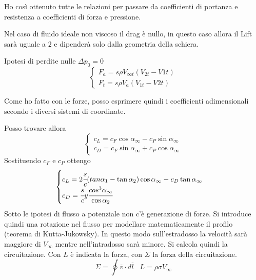 Ho così ottenuto tutte le relazioni per passare da coefficienti di portanza e resistenza a coefficienti di forza e pressione.

Nel caso di fluido ideale non viscoso il drag è nullo, in questo caso allora il Lift sarà uguale a $2$ e dipenderà solo dalla geometria della schiera. 

Ipotesi di perdite nulle $\Delta p_0 = 0$
\begin{equation}
\begin{cases}
F_a = s \rho V_{\infty t} (V_{2t}-V{1t})\\
F_t = s \rho V_a (V_{1t}-V{2t})
\end{cases}
\end{equation}

Come ho fatto con le forze, posso esprimere quindi i coefficienti adimensionali secondo i diversi sistemi di coordinate. 

Posso trovare allora
\begin{equation}
\begin{cases}
c_L = c_F \cos \alpha_{\infty} - c_P \sin \alpha_{\infty} \\
c_D = c_F \sin \alpha_{\infty} + c_P \cos \alpha_{\infty}
\end{cases}
\end{equation}
Sostituendo $c_F$ e $c_P$ ottengo
\begin{equation}
\begin{cases}
c_L = 2 \cfrac{s}{c} (tan \alpha_1 - \tan \alpha_2) \cos \alpha_{\infty} - c_D \tan \alpha_{\infty} \\
c_D = \cfrac{s}{c} y \cfrac{cos^3 \alpha_{\infty}}{\cos \alpha_2}
\end{cases}
\end{equation}
Sotto le ipotesi di flusso a potenziale non c'è generazione di forze. Si introduce quindi una rotazione nel flusso per modellare matematicamente il profilo (teorema di Kutta-Jukowsky). In questo modo sull'estradosso la velocità sarà maggiore di $V_{\infty}$ mentre nell'intradosso sarà minore. Si calcola quindi la circuitazione. Con $L$ è indicata la forza, con $\Sigma$ la forza della circuitazione.
\begin{equation}
\Sigma = \oint \overline{v} \cdot d \overline{l} \;\;\; L = \rho \sigma V_{\infty}
\end{equation}

